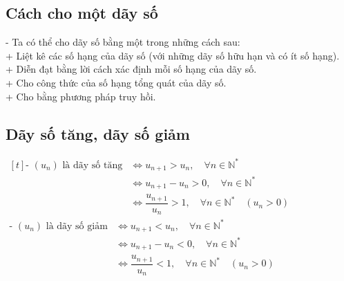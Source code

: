 \begin{center}
     
\end{center}

\subsection{Cách cho một dãy số}
\noindent\hspace*{1cm}- Ta có thể cho dãy số bằng một trong những cách sau:\\[6pt]
\noindent\hspace*{1.5cm}+ Liệt kê các số hạng của dãy số (với những dãy số hữu hạn và có ít số hạng).\\[6pt]
\noindent\hspace*{1.5cm}+ Diễn đạt bằng lời cách xác định mỗi số hạng của dãy số.\\[6pt]
\noindent\hspace*{1.5cm}+ Cho công thức của số hạng tổng quát của dãy số.\\[6pt]
\noindent\hspace*{1.5cm}+ Cho bằng phương pháp truy hồi.

\subsection{Dãy số tăng, dãy số giảm}
\noindent\hspace*{1cm}$
\begin{aligned}[t]
    \text{- } (u_n)\text{ là dãy số tăng}
    &\iff u_{n + 1} > u_n, \quad \forall n \in \mathbb{N}^* \\[6pt]
    &\iff u_{n + 1} - u_n > 0, \quad \forall n \in \mathbb{N}^* \\[6pt]
    &\boxed{\iff \dfrac{u_{n + 1}}{u_n} > 1, \quad \forall n \in \mathbb{N}^* \quad (u_n > 0)}
\end{aligned}
$
\\[12pt]
\noindent\hspace*{1cm}$
    \begin{aligned}
        \text{- } (u_n) \text{ là dãy số giảm}
        &\iff u_{n + 1} < u_n, \quad \forall n \in \mathbb{N}^* \\[6pt]
        &\iff u_{n + 1} - u_n < 0, \quad \forall n \in \mathbb{N}^* \\[6pt]
        &\boxed{\iff \dfrac{u_{n + 1}}{u_n} < 1, \quad \forall n \in \mathbb{N}^* \quad (u_n > 0)}     
    \end{aligned}
$

